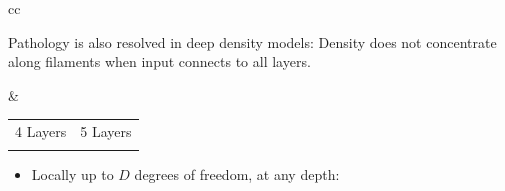 \documentclass[portrait,a0b,final,a4resizeable]{include/a0poster}
\begin{document}
\begin{poster}
\begin{multicols}{2}
\vspace{0.3in}



\newcommand{\gpdrawboxcon}[1]{
\setlength\fboxsep{0pt}
\hspace{-0.4in} 
\fbox{
\texttt{[image: ../../figures/connected\_deep\_sample\_seed\_0/deep\_sample\_connected\_layer\#1]}
}}

\begin{tabular}{cc}
\begin{minipage}[c]{0.45\columnwidth}
Pathology is also resolved in deep density models:  Density does not concentrate along filaments when input connects to all layers.
\end{minipage}
&
\begin{minipage}[c]{0.45\columnwidth}
\centering
\begin{tabular}{cc}
 4 Layers & 5 Layers \\
\gpdrawboxcon{4} &
\gpdrawboxcon{5}
\end{tabular}
\end{minipage}
\end{tabular}

\begin{itemize}
	\item Locally up to $D$ degrees of freedom, at any depth:
\end{itemize}
\vspace{0.3in}


\end{multicols}
\end{poster}
\end{document}
